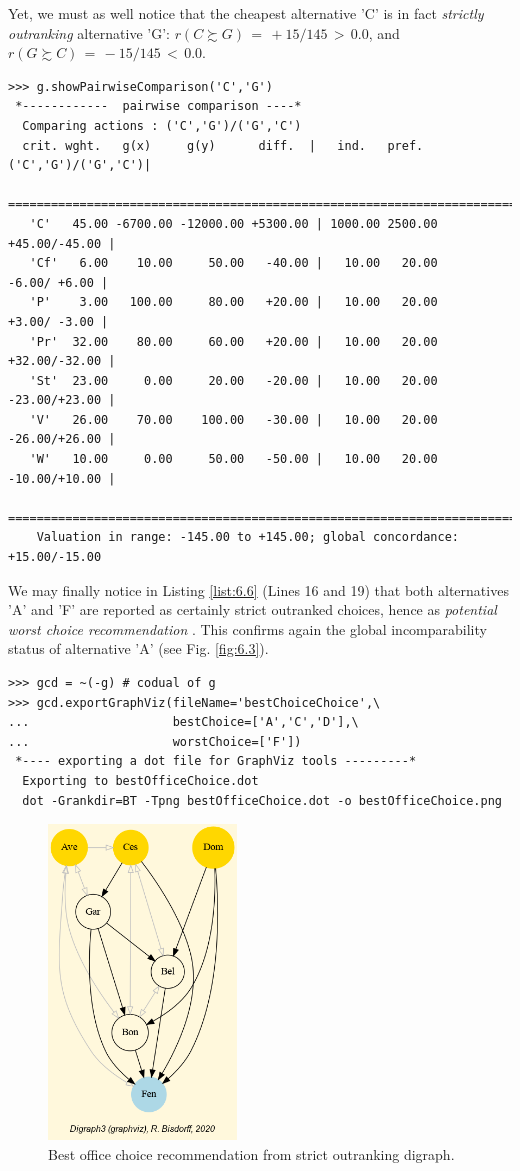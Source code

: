 Yet, we must as well notice that the cheapest alternative 'C' is in fact \emph{strictly outranking} alternative 'G':  $r(C \succsim G)\, =\, +15/145\, >\, 0.0$, and $r(G \succsim C)\, =\, -15/145 \,<\, 0.0$.
\begin{lstlisting}[basicstyle=\scriptsize]
>>> g.showPairwiseComparison('C','G')
 *------------  pairwise comparison ----*
  Comparing actions : ('C','G')/('G','C')
  crit. wght.   g(x)     g(y)      diff.  |   ind.   pref. ('C','G')/('G','C')|
   ===========================================================================
   'C'   45.00 -6700.00 -12000.00 +5300.00 | 1000.00 2500.00    +45.00/-45.00 | 
   'Cf'   6.00    10.00     50.00   -40.00 |   10.00   20.00     -6.00/ +6.00 | 
   'P'    3.00   100.00     80.00   +20.00 |   10.00   20.00     +3.00/ -3.00 | 
   'Pr'  32.00    80.00     60.00   +20.00 |   10.00   20.00    +32.00/-32.00 | 
   'St'  23.00     0.00     20.00   -20.00 |   10.00   20.00    -23.00/+23.00 | 
   'V'   26.00    70.00    100.00   -30.00 |   10.00   20.00    -26.00/+26.00 | 
   'W'   10.00     0.00     50.00   -50.00 |   10.00   20.00    -10.00/+10.00 |
   ===========================================================================
    Valuation in range: -145.00 to +145.00; global concordance: +15.00/-15.00
\end{lstlisting}

We may finally notice in Listing \ref{list:6.6} (Lines 16 and 19) that both alternatives 'A' and 'F' are reported as certainly strict outranked choices, hence as \emph{potential worst choice recommendation} . This confirms again the global incomparability status of alternative 'A' (see Fig. \ref{fig:6.3}).
\begin{lstlisting}
>>> gcd = ~(-g) # codual of g
>>> gcd.exportGraphViz(fileName='bestChoiceChoice',\
...                    bestChoice=['A','C','D'],\
...                    worstChoice=['F'])
 *---- exporting a dot file for GraphViz tools ---------*
  Exporting to bestOfficeChoice.dot
  dot -Grankdir=BT -Tpng bestOfficeChoice.dot -o bestOfficeChoice.png
\end{lstlisting}
\begin{figure}[h]
\sidecaption
\includegraphics[width=5cm]{Figures/bestOfficeChoice.png}
\caption{Best office choice recommendation from strict outranking digraph.}
\label{fig:6.4}       %
\end{figure}

